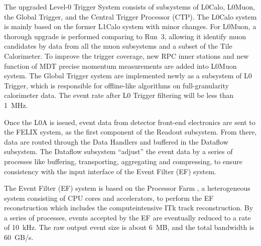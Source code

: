 The upgraded Level-0 Trigger System consists of subsystems of L0Calo, L0Muon, the Global Trigger, and the Central Trigger Processor (CTP). The L0Calo system is mainly based on the former L1Calo system with minor changes. For L0Muon, a thorough upgrade is performed comparing to Run~3, allowing it identify muon candidates by data from all the muon subsystems and a subset of the Tile Calorimeter. To improve the trigger coverage, new RPC inner stations and new function of MDT precise momentum measurements are added into L0Muon system. The Global Trigger system are implemented newly as a subsystem of L0 Trigger, which is responsible for offline-like algorithms on full-granularity calorimeter data. The event rate after L0 Trigger filtering will be less than 1~MHz.

Once the L0A is issued, event data from detector front-end electronics are sent to the FELIX system, as the first component of the Readout subsystem. From there, data are routed through the Data Handlers and buffered in the Dataflow subsystem. The Dataflow subsystem ``adjust'' the event data by a series of processes like buffering, transporting, aggregating and compressing, to ensure consistency with the input interface of the Event Filter (EF) system.

The Event Filter (EF) system is based on the Processor Farm \cite{TDAQ_TDR_EF}, a heterogeneous system consisting of CPU cores and accelerators, to perform the EF reconstruction which includes the computeintensive ITk track reconstruction. By a series of processes, events accepted by the EF are eventually reduced to a rate of 10~kHz. The raw output event size is about 6~MB, and the total bandwidth is 60~GB/s.

